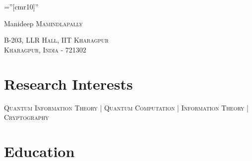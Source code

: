 \documentclass[a4paper,10pt]{article}
\def \siteurl{https://manideepmamindlapally.ninja}
\begin{document}


\pagestyle{empty} %

\font\fb=''[cmr10]'' %


\par{\centering
		{\Huge Manideep \textsc{Mamindlapally}
	}\par}



\par{\centering
		{ \textsc{B-203, LLR Hall, IIT Kharagpur\\ Kharagpur, India - 721302}\\
		}\par
	}
	
	\par{ \centering
\href{https://scholar.google.com/citations?hl=en&user=w-PmSxAAAAAJ}{\textcolor{black}{\faGraduationCap}}
\href{https://github.com/manideepmamindlapally}{\textcolor{black}{\faGithubSquare}}
\href{https://www.linkedin.com/in/manideep-mamindlapally}{\textcolor{black}{\faLinkedin}}
\href{\siteurl}{\textcolor{black}{\faGlobe}}
\href{https://twitter.com/manideepyx}{\textcolor{black}{\faTwitter}}
\href{mailto:manideepyx@iitkgp.ac.in}{\textcolor{black}{\faEnvelope}}
\href{tel:+919515399302}{\textcolor{black}{\faPhoneSquare*}}
\par}

\section{Research Interests}
\centering
\textsc{Quantum Information Theory} | \textsc{Quantum Computation} | \textsc{Information Theory} | \textsc{Cryptography}
\section{Education}
\end{document}
